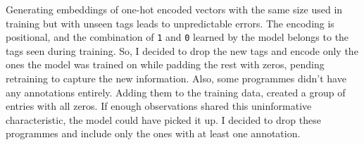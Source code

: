 Generating embeddings of one-hot encoded vectors with the same size used in training but with
unseen tags leads to unpredictable errors.
The encoding is positional, and the combination of \verb|1| and \verb|0| learned by the model
belongs to the tags seen during training. So, I decided to drop the new tags and encode only the ones the model was trained on
while padding the rest with zeros, pending retraining to capture the new information.
Also, some programmes didn't have any annotations entirely. Adding them to the training data, created a group of entries with all zeros.
If enough observations shared this uninformative characteristic, the model could have picked it up.
I decided to drop these programmes and include only the ones with at least one annotation.
